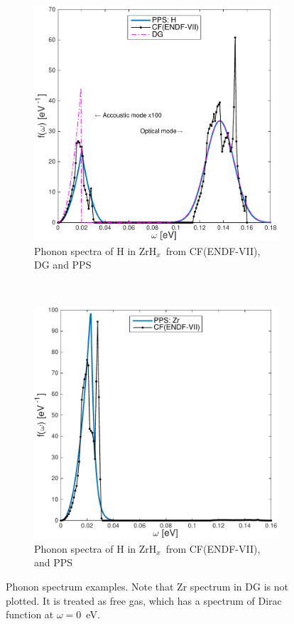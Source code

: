 \documentclass[review]{elsarticle}
\newcommand{\zh}{ZrH$_x$}
\begin{document}
\begin{figure}[ht!]
	\begin{subfigure}{0.5\textwidth}
		\centering
		\hspace*{-3.5cm}\includegraphics[width=1.4\linewidth]{NSE15-48R1_Figure1a.pdf}
		\caption{Phonon spectra of H in \zh~from CF(ENDF-VII), DG and PPS}
		\label{fg:pph1}
	\end{subfigure}
	~
	\begin{subfigure}{0.5\textwidth}
		\centering
		\hspace*{-.5cm}\includegraphics[width=1.4\linewidth]{NSE15-48R1_Figure1b.pdf}
		\caption{Phonon spectra of H in \zh~from CF(ENDF-VII),  and PPS}
		\label{fg:ppz1}
	\end{subfigure}
	\caption{Phonon spectrum examples. Note that Zr spectrum in DG is not plotted. It is treated as free gas, which has a spectrum of Dirac function at $\omega=0$\ eV\cite{NJOY,Macf}.}
	\label{fg:ps0}
\end{figure}
\end{document}
